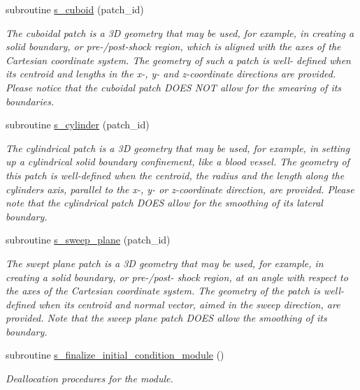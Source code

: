 \begin{DoxyCompactItemize}
subroutine \hyperlink{namespacem__initial__condition_a2297a9b98d2478b3594083197bd9b8b5}{s\+\_\+cuboid} (patch\+\_\+id)
\begin{DoxyCompactList}\small\item\em The cuboidal patch is a 3D geometry that may be used, for example, in creating a solid boundary, or pre-\//post-\/shock region, which is aligned with the axes of the Cartesian coordinate system. The geometry of such a patch is well-\/ defined when its centroid and lengths in the x-\/, y-\/ and z-\/coordinate directions are provided. Please notice that the cuboidal patch D\+O\+ES N\+OT allow for the smearing of its boundaries. \end{DoxyCompactList}\item 
subroutine \hyperlink{namespacem__initial__condition_af834c631376de6906fb6b002df70ce49}{s\+\_\+cylinder} (patch\+\_\+id)
\begin{DoxyCompactList}\small\item\em The cylindrical patch is a 3D geometry that may be used, for example, in setting up a cylindrical solid boundary confinement, like a blood vessel. The geometry of this patch is well-\/defined when the centroid, the radius and the length along the cylinder\textquotesingle{}s axis, parallel to the x-\/, y-\/ or z-\/coordinate direction, are provided. Please note that the cylindrical patch D\+O\+ES allow for the smoothing of its lateral boundary. \end{DoxyCompactList}\item 
subroutine \hyperlink{namespacem__initial__condition_a51f30d0a86584bdc757c22ebf7993e88}{s\+\_\+sweep\+\_\+plane} (patch\+\_\+id)
\begin{DoxyCompactList}\small\item\em The swept plane patch is a 3D geometry that may be used, for example, in creating a solid boundary, or pre-\//post-\/ shock region, at an angle with respect to the axes of the Cartesian coordinate system. The geometry of the patch is well-\/defined when its centroid and normal vector, aimed in the sweep direction, are provided. Note that the sweep plane patch D\+O\+ES allow the smoothing of its boundary. \end{DoxyCompactList}\item 
subroutine \hyperlink{namespacem__initial__condition_a944c63abd61afab021ab664246f80495}{s\+\_\+finalize\+\_\+initial\+\_\+condition\+\_\+module} ()
\begin{DoxyCompactList}\small\item\em Deallocation procedures for the module. \end{DoxyCompactList}\end{DoxyCompactItemize}
